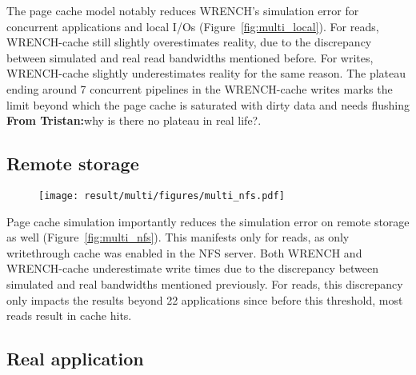 \documentclass[conference]{IEEEtran}
\newcommand{\tristan}[1]{\color{orange}\textbf{From Tristan:}#1\color{black}}
\newcommand{\wrench}{WRENCH\xspace}
\begin{document}
            The page cache model notably reduces \wrench's simulation error
            for concurrent applications and local I/Os
            (Figure~\ref{fig:multi_local}). For reads, \wrench-cache still
            slightly overestimates reality, due to the discrepancy between
            simulated and real read bandwidths mentioned before. For writes,
            \wrench-cache slightly underestimates reality for the same reason. The plateau
            ending around 7 concurrent pipelines in the \wrench-cache writes
            marks the limit beyond which the page cache is saturated with dirty data
            and needs flushing \tristan{why is there no plateau in real life?}.

        \subsection{Remote storage}

            \begin{figure*}
            \begin{subfigure}{\linewidth}
                \centering
                \texttt{[image: result/multi/figures/multi\_nfs.pdf]}
            \end{subfigure}
            \caption{NFS results with 3~GB files (averages on 5 repetitions)}
            \label{fig:multi_nfs}
            \end{figure*}

            Page cache simulation importantly reduces the simulation error
            on remote storage as well (Figure~\ref{fig:multi_nfs}). This
            manifests only for reads, as only writethrough cache was
            enabled in the NFS server. Both \wrench and \wrench-cache
            underestimate write times due to the discrepancy between
            simulated and real bandwidths mentioned previously. For reads,
            this discrepancy only impacts the results beyond 22
            applications since before this threshold, most reads result in cache
            hits.

        \subsection{Real application}
\end{document}

